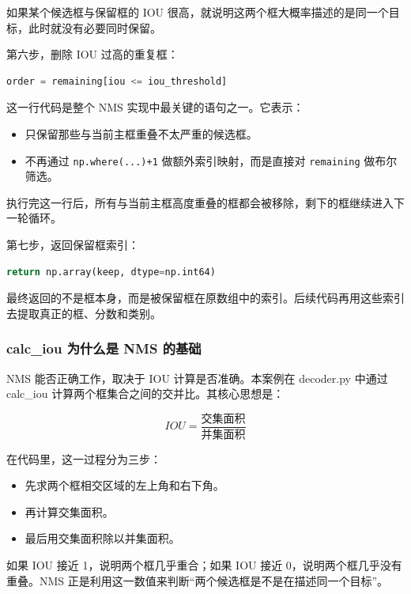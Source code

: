 如果某个候选框与保留框的 IOU
很高，就说明这两个框大概率描述的是同一个目标，此时就没有必要同时保留。

第六步，删除 IOU 过高的重复框：

\begin{lstlisting}[language=Python]
order = remaining[iou <= iou_threshold]
\end{lstlisting}

这一行代码是整个 NMS 实现中最关键的语句之一。它表示：

\begin{itemize}
\tightlist
\item
  只保留那些与当前主框重叠不太严重的候选框。
\item
  不再通过 \passthrough{\lstinline!np.where(...)+1!}
  做额外索引映射，而是直接对 \passthrough{\lstinline!remaining!}
  做布尔筛选。
\end{itemize}

执行完这一行后，所有与当前主框高度重叠的框都会被移除，剩下的框继续进入下一轮循环。

第七步，返回保留框索引：

\begin{lstlisting}[language=Python]
return np.array(keep, dtype=np.int64)
\end{lstlisting}

最终返回的不是框本身，而是被保留框在原数组中的索引。后续代码再用这些索引去提取真正的框、分数和类别。

\subsubsection{calc\_iou 为什么是 NMS
的基础}\label{src-experiment-case2-h34}

NMS 能否正确工作，取决于 IOU 计算是否准确。本案例在 decoder.py 中通过
calc\_iou 计算两个框集合之间的交并比。其核心思想是：

\[
IOU = \frac{\text{交集面积}}{\text{并集面积}}
\]

在代码里，这一过程分为三步：

\begin{itemize}
\tightlist
\item
  先求两个框相交区域的左上角和右下角。
\item
  再计算交集面积。
\item
  最后用交集面积除以并集面积。
\end{itemize}

如果 IOU 接近 1，说明两个框几乎重合；如果 IOU 接近
0，说明两个框几乎没有重叠。NMS
正是利用这一数值来判断``两个候选框是不是在描述同一个目标''。

